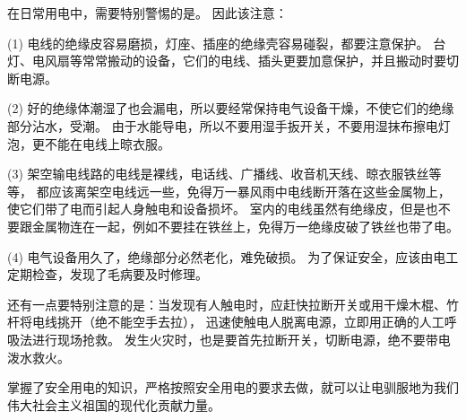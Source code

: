 在日常用电中，需要特别警惕的是。
因此该注意：

(1) \quad
电线的绝缘皮容易磨损，灯座、插座的绝缘壳容易碰裂，都要注意保护。
台灯、电风扇等常常搬动的设备，它们的电线、插头更要加意保护，并且搬动时要切断电源。

(2) \quad
好的绝缘体潮湿了也会漏电，所以要经常保持电气设备干燥，不使它们的绝缘部分沾水，受潮。
由于水能导电，所以不要用湿手扳开关，不要用湿抹布擦电灯泡，更不能在电线上晾衣服。

(3) \quad
架空输电线路的电线是裸线，电话线、广播线、收音机天线、晾衣服铁丝等等，
都应该离架空电线远一些，免得万一暴风雨中电线断开落在这些金属物上，使它们带了电而引起人身触电和设备损坏。
室内的电线虽然有绝缘皮，但是也不要跟金属物连在一起，例如不要挂在铁丝上，免得万一绝缘皮破了铁丝也带了电。

(4) \quad
电气设备用久了，绝缘部分必然老化，难免破损。
为了保证安全，应该由电工定期检查，发现了毛病要及时修理。

还有一点要特别注意的是：当发现有人触电时，应赶快拉断开关或用干燥木棍、竹杆将电线挑开（绝不能空手去拉），
迅速使触电人脱离电源，立即用正确的人工呼吸法进行现场抢救。
发生火灾时，也是要首先拉断开关，切断电源，绝不要带电泼水救火。

掌握了安全用电的知识，严格按照安全用电的要求去做，就可以让电驯服地为我们伟大社会主义祖国的现代化贡献力量。

